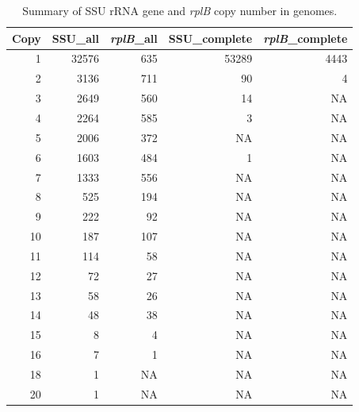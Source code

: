 \documentclass[]{msu-thesis}
\begin{document}
\begin{table}[htbp]
  \centering
  \caption[Summary of SSU rRNA gene and \textit{rplB} copy number in genomes]{Summary of SSU rRNA gene and \textit{rplB} copy number in genomes. }
    \begin{tabular}{|rrrrr|}
    \toprule
    \multicolumn{1}{|l}{Copy} & \multicolumn{1}{l}{SSU\_all} & \multicolumn{1}{l}{\textit{rplB}\_all} & \multicolumn{1}{l}{SSU\_complete} & \multicolumn{1}{l|}{\textit{rplB}\_complete} \\
    \midrule
    1     & 32576 & 635   & 53289 & 4443 \\
    2     & 3136  & 711   & 90    & 4 \\
    3     & 2649  & 560   & 14    & NA \\
    4     & 2264  & 585   & 3     & NA \\
    5     & 2006  & 372   & NA    & NA \\
    6     & 1603  & 484   & 1     & NA \\
    7     & 1333  & 556   & NA    & NA \\
    8     & 525   & 194   & NA    & NA \\
    9     & 222   & 92    & NA    & NA \\
    10    & 187   & 107   & NA    & NA \\
    11    & 114   & 58    & NA    & NA \\
    12    & 72    & 27    & NA    & NA \\
    13    & 58    & 26    & NA    & NA \\
    14    & 48    & 38    & NA    & NA \\
    15    & 8     & 4     & NA    & NA \\
    16    & 7     & 1     & NA    & NA \\
    18    & 1     & NA    & NA    & NA \\
    20    & 1     & NA    & NA    & NA \\
    \bottomrule
    \end{tabular}%
  \label{tab:S2}%
\end{table}%
\end{document}
